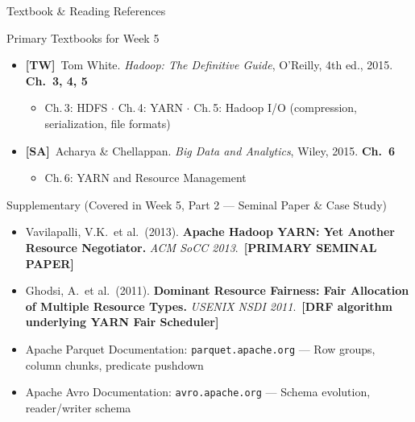 \documentclass[aspectratio=169,10pt]{beamer}
\begin{document}
\begin{frame}{Textbook \& Reading References}
  \begin{block}{Primary Textbooks for Week 5}
    \begin{itemize}
      \item \textbf{[TW]}\ Tom White. \textit{Hadoop: The Definitive Guide}, O'Reilly, 4th ed., 2015.
            \hfill \textbf{Ch.\ 3, 4, 5}
            \begin{itemize}
              \small\item Ch.\,3: HDFS $\cdot$ Ch.\,4: YARN $\cdot$ Ch.\,5: Hadoop I/O (compression, serialization, file formats)
            \end{itemize}
      \item \textbf{[SA]}\ Acharya \& Chellappan. \textit{Big Data and Analytics}, Wiley, 2015.
            \hfill \textbf{Ch.\ 6}
            \begin{itemize}
              \small\item Ch.\,6: YARN and Resource Management
            \end{itemize}
    \end{itemize}
  \end{block}
  \vspace{6pt}
  \begin{exampleblock}{Supplementary (Covered in Week 5, Part 2 — Seminal Paper \& Case Study)}
    \begin{itemize}
      \small
      \item Vavilapalli, V.K.\ et al.\ (2013). \textbf{Apache Hadoop YARN: Yet Another Resource Negotiator.}
            \textit{ACM SoCC 2013}.\ \textbf{[PRIMARY SEMINAL PAPER]}
      \item Ghodsi, A.\ et al.\ (2011). \textbf{Dominant Resource Fairness: Fair Allocation of Multiple Resource Types.}
            \textit{USENIX NSDI 2011}.\ \textbf{[DRF algorithm underlying YARN Fair Scheduler]}
      \item Apache Parquet Documentation: \texttt{parquet.apache.org} — Row groups, column chunks, predicate pushdown
      \item Apache Avro Documentation: \texttt{avro.apache.org} — Schema evolution, reader/writer schema
    \end{itemize}
  \end{exampleblock}
\end{frame}
\end{document}
